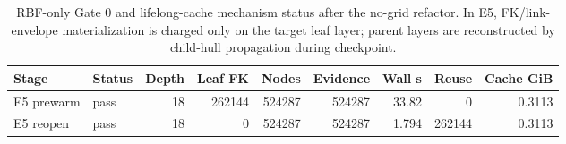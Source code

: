 \begin{table}[t]
\centering
\caption{RBF-only Gate 0 and lifelong-cache mechanism status after the no-grid refactor. In E5, FK/link-envelope materialization is charged only on the target leaf layer; parent layers are reconstructed by child-hull propagation during checkpoint.}
\label{tab:tro_appendix_rbf_only_cache_mechanism}
\footnotesize
\setlength{\tabcolsep}{2.40pt}
\renewcommand{\arraystretch}{0.95}
\begin{tabular}{llrrrrrrr}
\toprule
Stage & Status & Depth & Leaf FK & Nodes & Evidence & Wall s & Reuse & Cache GiB \\
\midrule
E5 prewarm & pass & 18 & 262144 & 524287 & 524287 & 33.82 & 0 & 0.3113 \\
E5 reopen & pass & 18 & 0 & 524287 & 524287 & 1.794 & 262144 & 0.3113 \\
\bottomrule
\end{tabular}
\end{table}
